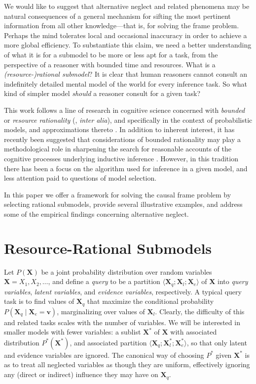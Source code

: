 \documentclass[10pt,letterpaper]{article}
\begin{document}
We would like to suggest that alternative neglect and related phenomena may be natural consequences of a general mechanism for sifting the most pertinent information from all other knowledge---that is, for solving the frame problem. Perhaps the mind tolerates local and occasional inaccuracy in order to achieve a more global efficiency. 
To substantiate this claim, we need a better understanding of what it is for a submodel to be more or less apt for a task, from the perspective of a reasoner with bounded time and resources. What is a \emph{(resource-)rational submodel}? It is clear that human reasoners cannot consult an indefinitely detailed mental model of the world for every inference task. So what kind of simpler model \emph{should} a reasoner consult for a given task?

This work follows a line of research in cognitive science concerned with \emph{bounded} or \emph{resource rationality} (\citealt{Simon1957,Gigerenzer1996}, \emph{inter alia}), and specifically in the context of probabilistic models, and approximations thereto \citep{Vul2014}. In addition to inherent interest, it has recently been suggested that considerations of bounded rationality may play a methodological role in sharpening the search for reasonable accounts of the cognitive processes underlying inductive inference \citep{Griffiths2014,Icard2014}. However, in this tradition there has been a focus on the algorithm used for inference in a given model, and less attention paid to questions of model selection.

In this paper we offer a framework for solving the causal frame problem by selecting rational submodels, provide several illustrative examples, and address some of the empirical findings concerning alternative neglect.

\section{Resource-Rational Submodels}

Let $P(\textbf{X})$ be a joint probability distribution over random variables $\textbf{X} = X_1,X_2,\dots$, and define a \emph{query} to be a partition $\langle \textbf{X}_q;\textbf{X}_l;\textbf{X}_e\rangle$ of \textbf{X} into \emph{query variables}, \emph{latent variables}, and \emph{evidence variables}, respectively. A typical query task is to find values of $\textbf{X}_q$ that maximize the conditional probability $P(\textbf{X}_q\mid \textbf{X}_e = \textbf{v})$, marginalizing over values of $\textbf{X}_l$. Clearly, the difficulty of this and related tasks scales with the number of variables. We will be interested in smaller models with fewer variables: a sublist $\textbf{X}^*$ of $\textbf{X}$ with associated distribution $P^*(\textbf{X}^*)$, and associated partition $\langle \textbf{X}_q;\textbf{X}_l^*;\textbf{X}_e^*\rangle$, so that only latent and evidence variables are ignored. The canonical way of choosing $P^*$ given $\textbf{X}^*$ is as to treat all neglected variables as though they are uniform, effectively ignoring any (direct or indirect) influence they may have on $\textbf{X}_q$.
\end{document}
